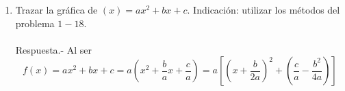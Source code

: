 \begin{enumerate}
    \item Trazar la gráfica de $(x)=ax^2+bx+c$. Indicación: utilizar los métodos del problema $1-18$.\\\\
	Respuesta.-\; Al ser $$f(x)=ax^2+bx+c=a\left( x^2 + \dfrac{b}{a}x + \dfrac{c}{a} \right) = a \left[ \left( x + \dfrac{b}{2a} \right)^2 + \left( \dfrac{c}{a} - \dfrac{b^2}{4a} \right)  \right]$$ 
	\begin{center}
	\end{center}
	\vspace{0.5cm}


\end{enumerate}
